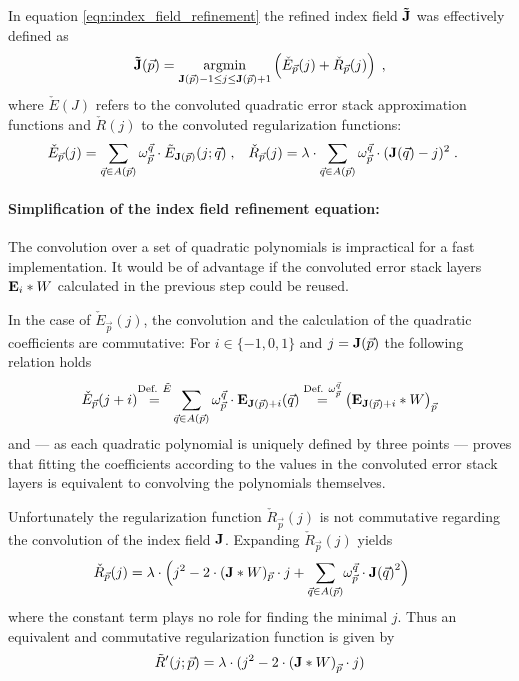 In equation \ref{eqn:index_field_refinement} the refined index field $\mathbf{\tilde J}$ was effectively defined as
\begin{equation}
\img{\tilde J}(\vec p) = \argmin_{\img{J}(\vec p) - 1 \leq j \leq \img{J}(\vec p) + 1}
  \left( \check E_{\vec p}(j) + \check R_{\vec p}(j) \right) \; ,
  \label{eqn:index_field_refinement_impl}
\end{equation}
where $\check E(J)$ refers to the convoluted quadratic error stack approximation functions and $\check R(j)$ to the convoluted regularization functions:
\begin{align*}
   \check E_{\vec p}(j) &= \sum_{\vec q \in A(\vec p)} \omega_{\vec p}^{\vec q} \cdot \tilde E_{\img{J}(\vec p)}(j; \vec q) \; ,
 & \check R_{\vec p}(j) &= \lambda \cdot \sum_{\vec q \in A(\vec p)} \omega_{\vec p}^{\vec q} \cdot (\img{J}(\vec q) - j)^2 \; .
\end{align*}


\paragraph{Simplification of the index field refinement equation:} The convolution over a set of quadratic polynomials is impractical for a fast implementation. It would be of advantage if the convoluted error stack layers $\mathbf{E}_i \ast W$ calculated in the previous step could be reused.

In the case of $\check E_{\vec p}(j)$, the convolution and the calculation of the quadratic coefficients are commutative: For $i \in \{-1, 0, 1\}$ and $j = \img{J}(\vec p)$ the following relation holds
\begin{equation*}
  \check E_{\vec p}(j + i)
  {\overset{\text{Def. }\tilde E\vphantom{\omega_{\vec p}^{\vec q}}}=} \sum_{\vec q \in A(\vec p)} \omega_{\vec p}^{\vec q} \cdot \img{E}_{\img{J}(\vec p) + i}(\vec q) \\
  \overset{\text{Def. }\omega_{\vec p}^{\vec q}}= \left(\img{E}_{\img{J}(\vec p) + i} \ast W\right)_{\vec p}
\end{equation*}
and --- as each quadratic polynomial is uniquely defined by three points --- proves that fitting the coefficients according to the values in the convoluted error stack layers is equivalent to convolving the polynomials themselves.

Unfortunately the regularization function $\check R_{\vec p}(j)$ is not commutative regarding the convolution of the index field $\mathbf{J}$. Expanding $\check R_{\vec p}(j)$ yields
\begin{align*}
  \check R_{\vec p}(j) &= \lambda \cdot \left(
    j^2 - 2 \cdot (\img{J} \ast W)_{\vec p} \cdot j +
    \smash{\sum_{\vec q \in A(\vec p)}} \omega_{\vec p}^{\vec q} \cdot \img{J(\vec q)}^2 \right)\vphantom{\sum_{\vec q \in A(\vec p)}}
\end{align*}
where the constant term plays no role for finding the minimal $j$. Thus an equivalent and commutative regularization function is given by
\begin{equation}
  \tilde R'(j; \vec p) = \lambda \cdot ( j^2 - 2 \cdot \left(\img{J} \ast W \right)_{\vec p} \cdot j)
\end{equation}

